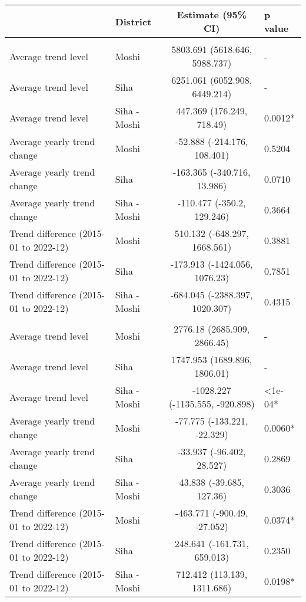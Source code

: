 \begingroup
\fontsize{12.0pt}{14.4pt}\selectfont
\begin{longtable}{l|lcl}
\toprule
 & District & Estimate (95\% CI) & p value \\ 
\midrule\addlinespace[2.5pt]
\multicolumn{4}{l}{Infectious/Communicable Diseases} \\[2.5pt] 
\midrule\addlinespace[2.5pt]
Average trend level & Moshi & 5803.691 (5618.646, 5988.737) & - \\ 
Average trend level & Siha & 6251.061 (6052.908, 6449.214) & - \\ 
Average trend level & Siha - Moshi & 447.369 (176.249, 718.49) & 0.0012* \\ 
Average yearly trend change & Moshi & -52.888 (-214.176, 108.401) & 0.5204 \\ 
Average yearly trend change & Siha & -163.365 (-340.716, 13.986) & 0.0710 \\ 
Average yearly trend change & Siha - Moshi & -110.477 (-350.2, 129.246) & 0.3664 \\ 
Trend difference (2015-01 to 2022-12) & Moshi & 510.132 (-648.297, 1668.561) & 0.3881 \\ 
Trend difference (2015-01 to 2022-12) & Siha & -173.913 (-1424.056, 1076.23) & 0.7851 \\ 
Trend difference (2015-01 to 2022-12) & Siha - Moshi & -684.045 (-2388.397, 1020.307) & 0.4315 \\ 
\midrule\addlinespace[2.5pt]
\multicolumn{4}{l}{Non-Communicable Diseases} \\[2.5pt] 
\midrule\addlinespace[2.5pt]
Average trend level & Moshi & 2776.18 (2685.909, 2866.45) & - \\ 
Average trend level & Siha & 1747.953 (1689.896, 1806.01) & - \\ 
Average trend level & Siha - Moshi & -1028.227 (-1135.555, -920.898) & <1e-04* \\ 
Average yearly trend change & Moshi & -77.775 (-133.221, -22.329) & 0.0060* \\ 
Average yearly trend change & Siha & -33.937 (-96.402, 28.527) & 0.2869 \\ 
Average yearly trend change & Siha - Moshi & 43.838 (-39.685, 127.36) & 0.3036 \\ 
Trend difference (2015-01 to 2022-12) & Moshi & -463.771 (-900.49, -27.052) & 0.0374* \\ 
Trend difference (2015-01 to 2022-12) & Siha & 248.641 (-161.731, 659.013) & 0.2350 \\ 
Trend difference (2015-01 to 2022-12) & Siha - Moshi & 712.412 (113.139, 1311.686) & 0.0198* \\ 
\bottomrule
\end{longtable}
\endgroup

